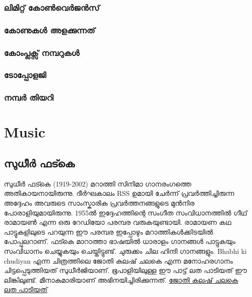 \documentclass[10pt,a4paper]{report}
\begin{document}
\subsection{ലിമിറ്റ്  കോൺവെർജൻസ് }

\subsection{കോണുകൾ അളക്കുന്നത് }

\subsection{കോംപ്ലക്സ് നമ്പറുകൾ}

\subsection{ടോപ്പോളജി }

\subsection{നമ്പർ തിയറി}  
 


\chapter{Music}
\section{ സുധീർ ഫട്കെ }
സുധീർ ഫട്കെ (1919-2002) മറാത്തി സിനിമാ ഗാനരംഗത്തെ അതികായനായിരുന്നു. ദീർഘകാലം RSS ഉമായി ചേർന്ന് പ്രവർത്തിച്ചിരുന്ന അദ്ദേഹം അവരുടെ സാംസ്കാരിക പ്രവർത്തനങ്ങളുടെ മുൻനിര പോരാളിയുമായിരുന്നു. 1955ൽ ഇദ്ദേഹത്തിന്റെ സംഗീത സംവിധാനത്തിൽ ഗീഥ് രാമായൺ എന്ന ഒരു റേഡിയോ പരമ്പര വരുകയുണ്ടായി. രാമായണ കഥ പാട്ടുകളിലുടെ പറയുന്ന ഈ പരമ്പര ഇപ്പോഴും മറാത്തികൾക്കിടയിൽ പോപ്പുലറാണ്. ഫട്കെ മാറാത്താ ഭാഷയിൽ ധാരാളം ഗാനങ്ങൾ പാട്ടുകയും സംവിധാനം ചെയ്യുകയും ചെയ്തിട്ടുണ്ട്. ചുരുക്കം ചില ഹിന്ദി ഗാനങ്ങളും. Bhabhi ki chudiyan എന്ന ചിത്രത്തിലെ ജോതി കലഷ് ചലകെ എന്ന മനോഹരഗാനം ചിട്ടപ്പെടുത്തിയത് സുധീർജിയാണ്. ഭൂപാളിയിലുള്ള ഈ പാട്ട് ലത പാടിയത് ഈ ലിങ്കിലുണ്ട്. മീനാകുമാരിയാണ് അഭിനയിച്ചിരിക്കുന്നത്.
\href{https://youtu.be/XiFSuo9qY9s}{ജോതി കലഷ് ചലകെ ലത പാടിയത്} 
\end{document}

